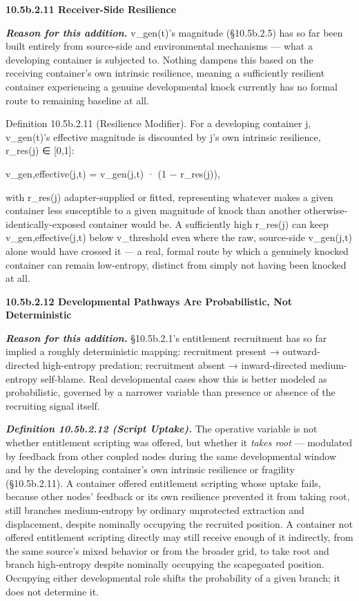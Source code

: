 \documentclass[
]{article}
\begin{document}
\textbf{10.5b.2.11 Receiver-Side Resilience}

\emph{\textbf{Reason for this addition.}} v\_gen(t)'s magnitude
(§10.5b.2.5) has so far been built entirely from source-side and
environmental mechanisms --- what a developing container is subjected
to. Nothing dampens this based on the receiving container's own
intrinsic resilience, meaning a sufficiently resilient container
experiencing a genuine developmental knock currently has no formal route
to remaining baseline at all.

Definition 10.5b.2.11 (Resilience Modifier). For a developing container
j, v\_gen(t)'s effective magnitude is discounted by j's own intrinsic
resilience, r\_res(j) ∈ {[}0,1{]}:

v\_gen,effective(j,t) = v\_gen(j,t) · (1 − r\_res(j)),

with r\_res(j) adapter-supplied or fitted, representing whatever makes a
given container less susceptible to a given magnitude of knock than
another otherwise-identically-exposed container would be. A sufficiently
high r\_res(j) can keep v\_gen,effective(j,t) below v\_threshold even
where the raw, source-side v\_gen(j,t) alone would have crossed it --- a
real, formal route by which a genuinely knocked container can remain
low-entropy, distinct from simply not having been knocked at all.

\textbf{10.5b.2.12 Developmental Pathways Are Probabilistic, Not
Deterministic}

\emph{\textbf{Reason for this addition.}} §10.5b.2.1's entitlement
recruitment has so far implied a roughly deterministic mapping:
recruitment present → outward-directed high-entropy predation;
recruitment absent → inward-directed medium-entropy self-blame. Real
developmental cases show this is better modeled as probabilistic,
governed by a narrower variable than presence or absence of the
recruiting signal itself.

\emph{\textbf{Definition 10.5b.2.12 (Script Uptake).}} The operative
variable is not whether entitlement scripting was offered, but whether
it \emph{takes root} --- modulated by feedback from other coupled nodes
during the same developmental window and by the developing container's
own intrinsic resilience or fragility (§10.5b.2.11). A container offered
entitlement scripting whose uptake fails, because other nodes' feedback
or its own resilience prevented it from taking root, still branches
medium-entropy by ordinary unprotected extraction and displacement,
despite nominally occupying the recruited position. A container not
offered entitlement scripting directly may still receive enough of it
indirectly, from the same source's mixed behavior or from the broader
grid, to take root and branch high-entropy despite nominally occupying
the scapegoated position. Occupying either developmental role shifts the
probability of a given branch; it does not determine it.
\end{document}
